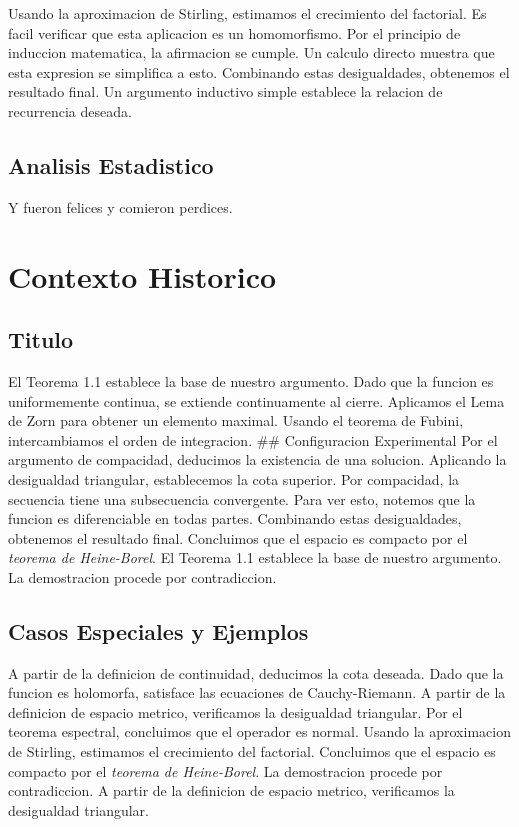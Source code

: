 \documentclass[
]{article}
\begin{document}
Usando la aproximacion de Stirling, estimamos el crecimiento del
factorial. Es facil verificar que esta aplicacion es un homomorfismo.
Por el principio de induccion matematica, la afirmacion se cumple. Un
calculo directo muestra que esta expresion se simplifica a esto.
Combinando estas desigualdades, obtenemos el resultado final. Un
argumento inductivo simple establece la relacion de recurrencia deseada.

\subsection{Analisis Estadistico}\label{analisis-estadistico}

Y fueron felices y comieron perdices.

\section{Contexto Historico}\label{contexto-historico}

\subsection{Titulo}\label{titulo}

El Teorema 1.1 establece la base de nuestro argumento. Dado que la
funcion es uniformemente continua, se extiende continuamente al cierre.
Aplicamos el Lema de Zorn para obtener un elemento maximal. Usando el
teorema de Fubini, intercambiamos el orden de integracion. \#\#
Configuracion Experimental Por el argumento de compacidad, deducimos la
existencia de una solucion. Aplicando la desigualdad triangular,
establecemos la cota superior. Por compacidad, la secuencia tiene una
subsecuencia convergente. Para ver esto, notemos que la funcion es
diferenciable en todas partes. Combinando estas desigualdades, obtenemos
el resultado final. Concluimos que el espacio es compacto por el
\emph{teorema de Heine-Borel}. El Teorema 1.1 establece la base de
nuestro argumento. La demostracion procede por contradiccion.

\subsection{Casos Especiales y
Ejemplos}\label{casos-especiales-y-ejemplos}

A partir de la definicion de continuidad, deducimos la cota deseada.
Dado que la funcion es holomorfa, satisface las ecuaciones de
Cauchy-Riemann. A partir de la definicion de espacio metrico,
verificamos la desigualdad triangular. Por el teorema espectral,
concluimos que el operador es normal. Usando la aproximacion de
Stirling, estimamos el crecimiento del factorial. Concluimos que el
espacio es compacto por el \emph{teorema de Heine-Borel}. La
demostracion procede por contradiccion. A partir de la definicion de
espacio metrico, verificamos la desigualdad triangular.
\end{document}
